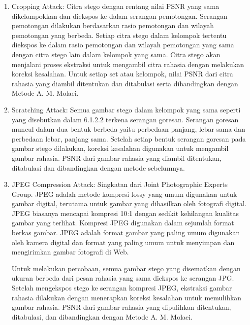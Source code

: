 \documentclass{ittelkom}
\begin{document}
\begin{enumerate}
    \item Cropping Attack: Citra stego dengan rentang nilai PSNR yang sama dikelompokkan
          dan diekspos ke dalam serangan pemotongan. Serangan pemotongan dilakukan
          berdasarkan rasio pemotongan dan wilayah pemotongan yang berbeda. Setiap citra
          stego dalam kelompok tertentu diekspos ke dalam rasio pemotongan dan wilayah
          pemotongan yang sama dengan citra stego lain dalam kelompok yang sama. Citra
          stego akan menjalani proses ekstraksi untuk mengambil citra rahasia dengan
          melakukan koreksi kesalahan. Untuk setiap set atau kelompok, nilai PSNR dari
          citra rahasia yang diambil ditentukan dan ditabulasi serta dibandingkan dengan
          Metode A. M. Molaei.
    \item Scratching Attack: Semua gambar stego dalam kelompok yang sama seperti yang
          disebutkan dalam 6.1.2.2 terkena serangan goresan. Serangan goresan muncul
          dalam dua bentuk berbeda yaitu perbedaan panjang, lebar sama dan perbedaan
          lebar, panjang sama. Setelah setiap bentuk serangan goresan pada gambar stego
          dilakukan, koreksi kesalahan digunakan untuk mengambil gambar rahasia. PSNR
          dari gambar rahasia yang diambil ditentukan, ditabulasi dan dibandingkan dengan
          metode sebelumnya.
    \item JPEG Compression Attack: Singkatan dari Joint Photographic Experts Group. JPEG
          adalah metode kompresi lossy yang umum digunakan untuk gambar digital, terutama
          untuk gambar yang dihasilkan oleh fotografi digital. JPEG biasanya mencapai
          kompresi 10:1 dengan sedikit kehilangan kualitas gambar yang
          terlihat.\cite{ch2015medical} Kompresi JPEG digunakan dalam sejumlah format
          berkas gambar. JPEG adalah format gambar yang paling umum digunakan oleh kamera
          digital dan format yang paling umum untuk menyimpan dan mengirimkan gambar
          fotografi di Web.

          Untuk melakukan percobaan, semua gambar stego yang disematkan dengan ukuran
          berbeda dari pesan rahasia yang sama diekspos ke serangan JPG. Setelah
          mengekspos stego ke serangan kompresi JPEG, ekstraksi gambar rahasia dilakukan
          dengan menerapkan koreksi kesalahan untuk memulihkan gambar rahasia. PSNR dari
          gambar rahasia yang dipulihkan ditentukan, ditabulasi, dan dibandingkan dengan
          Metode A. M. Molaei.
\end{enumerate}
\end{document}
